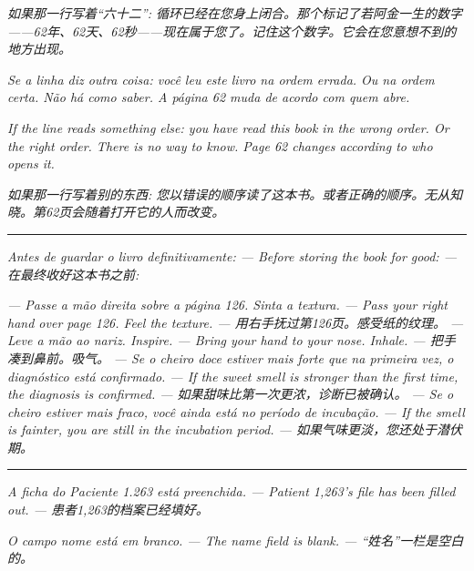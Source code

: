 \documentclass[14pt,openany]{extbook}
\begin{document}
\begin{center}
\noindent\textit{如果那一行写着“六十二”: 循环已经在您身上闭合。那个标记了若阿金一生的数字——62年、62天、62秒——现在属于您了。记住这个数字。它会在您意想不到的地方出现。}

\noindent\textit{Se a linha diz outra coisa: você leu este livro na ordem errada. Ou na ordem certa. Não há como saber. A página 62 muda de acordo com quem abre.}

\noindent\textit{If the line reads something else: you have read this book in the wrong order. Or the right order. There is no way to know. Page 62 changes according to who opens it.}

\noindent\textit{如果那一行写着别的东西: 您以错误的顺序读了这本书。或者正确的顺序。无从知晓。第62页会随着打开它的人而改变。}

\vspace{1.5em}

\noindent\textcolor{sangue}{\rule{0.15\textwidth}{0.5pt}}

\vspace{1.5em}

\noindent\textit{Antes de guardar o livro definitivamente: --- Before storing the book for good: --- 在最终收好这本书之前:}

\vspace{0.5em}

\noindent\textit{--- Passe a mão direita sobre a página 126. Sinta a textura. --- Pass your right hand over page 126. Feel the texture. --- 用右手抚过第126页。感受纸的纹理。}
\noindent\textit{--- Leve a mão ao nariz. Inspire. --- Bring your hand to your nose. Inhale. --- 把手凑到鼻前。吸气。}
\noindent\textit{--- Se o cheiro doce estiver mais forte que na primeira vez, o diagnóstico está confirmado. --- If the sweet smell is stronger than the first time, the diagnosis is confirmed. --- 如果甜味比第一次更浓，诊断已被确认。}
\noindent\textit{--- Se o cheiro estiver mais fraco, você ainda está no período de incubação. --- If the smell is fainter, you are still in the incubation period. --- 如果气味更淡，您还处于潜伏期。}

\vspace{1.5em}

\noindent\textcolor{sangue}{\rule{0.15\textwidth}{0.5pt}}

\vspace{1.5em}

\noindent\textit{A ficha do Paciente 1.263 está preenchida. --- Patient 1,263's file has been filled out. --- 患者1,263的档案已经填好。}

\noindent\textit{O campo \textquotedbl{}nome\textquotedbl{} está em branco. --- The \textquotedbl{}name\textquotedbl{} field is blank. --- “姓名”一栏是空白的。}


\end{center}
\end{document}
